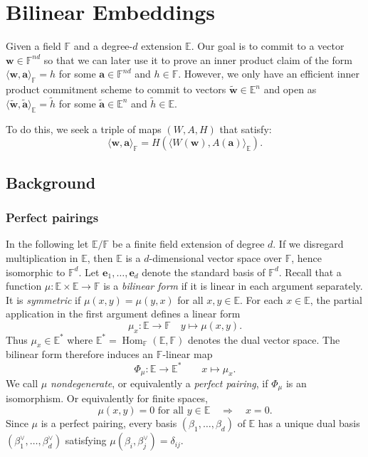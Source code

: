 \section{Bilinear Embeddings}\label{a:ring_switch_remco}

Given a field $\mathbb F$ and a degree-$d$ extension $\mathbb E$. Our goal is to commit to a vector $\mathbf{w} \in \mathbb{F}^{n d}$ so that we can later use it to prove an inner product claim of the form $\langle \mathbf{w}, \mathbf{a}\rangle_\mathbb{F} = h$ for some $\mathbf{a} \in \mathbb{F}^{n d}$ and $h \in \mathbb{F}$. However, we only have an efficient inner product commitment scheme to commit to vectors $\widetilde{\mathbf{w}} \in \mathbb{E}^{n}$ and open as $\langle \widetilde{\mathbf{w}}, \widetilde{\mathbf{a}}\rangle_\mathbb{E} = \widetilde{h}$ for some $\widetilde{\mathbf{a}} \in \mathbb{E}^{n}$ and $\widetilde{h} \in \mathbb{E}$.

To do this, we seek a triple of maps $(W, A, H)$ that satisfy:
\[ 
\langle \mathbf{w},\mathbf{a}\rangle_{\mathbb{F}}
=
H\left(\langle W(\mathbf{w}), A(\mathbf{a}) \rangle_{\mathbb{E}} \right).
\]

\subsection{Background}

\subsubsection{Perfect pairings}
In the following let $\mathbb{E}/\mathbb{F}$ be a finite field extension of degree $d$. If we disregard multiplication in $\mathbb{E}$, then $\mathbb{E}$ is a $d$-dimensional vector space over $\mathbb{F}$, hence isomorphic to $\mathbb{F}^d$. Let $\mathbf{e}_1,\ldots,\mathbf{e}_d$ denote the standard basis of $\mathbb{F}^d$.
Recall that a function $\mu:\mathbb{E}\times \mathbb{E} \rightarrow \mathbb{F}$ is a \emph{bilinear form}  if it is linear in each argument separately. It is \emph{symmetric} if $\mu(x, y) = \mu(y, x)$ for all $x,y \in \mathbb{E}$.
For each $x \in \mathbb{E}$, the partial application in the first argument defines a linear form
\[
\mu_{x} : \mathbb{E} \rightarrow \mathbb{F} \quad y \mapsto \mu(x, y).
\]
Thus $\mu_{x} \in \mathbb{E}^*$ where $\mathbb{E}^* = \operatorname{Hom}_\mathbb{F}(\mathbb{E}, \mathbb{F})$ denotes the dual vector space. The bilinear form therefore induces an $\mathbb{F}$-linear map
\[
\Phi_\mu:\mathbb{E}\to\mathbb{E}^* \qquad x\mapsto\mu_x.
\]
We call $\mu$ \emph{nondegenerate}, or equivalently a \emph{perfect pairing}, if $\Phi_\mu$ is an isomorphism. Or equivalently for finite spaces,  %
\[
\mu(x,y)=0\text{ for all }y\in\mathbb E \quad\Longrightarrow\quad x=0.
\]
Since $\mu$ is a perfect pairing, every basis $(\beta_1,\ldots,\beta_d)$ of $\mathbb{E}$ has a unique dual basis $(\beta_1^\vee,\ldots,\beta_d^\vee)$ satisfying $\mu(\beta_i, \beta_j^\vee) = \delta_{ij}$.

